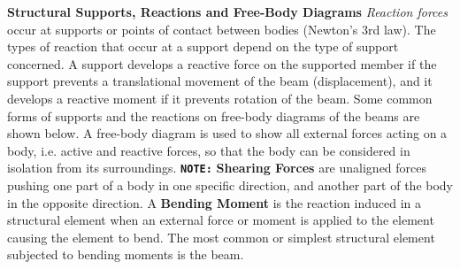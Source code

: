 \documentclass[12pt, letterpaper, twoside]{article}
\begin{document}
\textbf{Structural Supports, Reactions and Free-Body Diagrams}
\emph{Reaction forces} occur at supports or points of contact between bodies (Newton's 3rd law). The types of reaction that occur at a support depend on the type of support concerned. A support develops a reactive force on the supported member if the support prevents a translational movement of the beam (displacement), and it develops a reactive moment if it prevents rotation of the beam. Some common forms of supports and the reactions on free-body diagrams of the beams are shown below. A free-body diagram is used to show all external forces acting on a body, i.e. active and reactive forces, so that the body can be considered in isolation from its surroundings.
\linebreak
\texttt{\textbf{NOTE:}}
\linebreak
\textbf{Shearing Forces} are unaligned forces pushing one part of a body in one specific direction, and another part of the body in the opposite direction.
\linebreak
A \textbf{Bending Moment} is the reaction induced in a structural element when an external force or moment is applied to the element causing the element to bend. The most common or simplest structural element subjected to bending moments is the beam.


\begin{center}
\end{center}


\begin{center}
\end{center}
\end{document}
